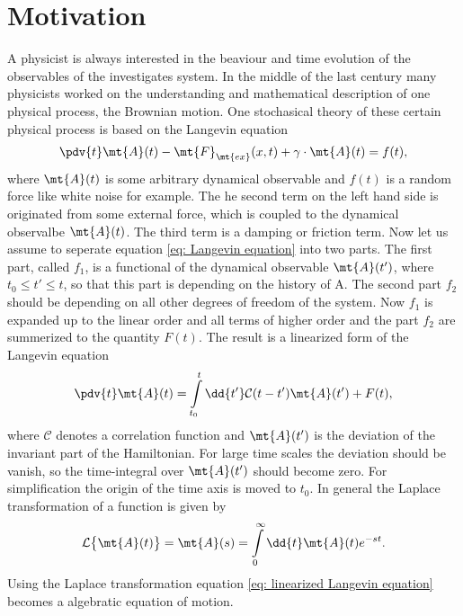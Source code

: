 \section{Motivation}
\label{sec: motivation}
%
%
A physicist is always interested in the beaviour and time evolution of the observables of the investigates system.
In the middle of the last century many physicists worked on the understanding and mathematical description of one physical process, the Brownian motion.
One stochasical theory of these certain physical process is based on the Langevin equation
%
\begin{align}
	\pdv{t} \mt{A}(t) -\mt{F}_{\mt{ex}}(x,t) + \gamma \cdot \mt{A}(t) = f(t),
	\label{eq: Langevin equation}
\end{align}
%
where $\mt{A}(t)$ is some arbitrary dynamical observable and $f(t)$ is a random force like white noise for example.
The he second term on the left hand side is originated from some external force, which is coupled to the dynamical observalbe $\mt{A}(t)$.
The third term is a damping or friction term.
Now let us assume to seperate equation \eqref{eq: Langevin equation} into two parts.
The first part, called $f_{1}$, is a functional of the dynamical observable $\mt{A}(t')$, where $t_{0} \leq t' \leq t$, so that this part is depending on the history of A.
The second part $f_{2}$ should be depending on all other degrees of freedom of the system.
Now $f_{1}$ is expanded up to the linear order and all terms of higher order and the part $f_{2}$ are summerized to the quantity $F(t)$.
The result is a linearized form of the Langevin equation
%
\begin{align}
	\pdv{t} \mt{A}(t) = \int\limits_{t_{0}}^{t} \dd{t'} \mathcal{C}(t-t') \mt{A}(t') + F(t),
	\label{eq: linearized Langevin equation}
\end{align}
%
where $\mathcal{C}$ denotes a correlation function and $\mt{A}(t')$ is the deviation of the invariant part of the Hamiltonian.
For large time scales the deviation should be vanish, so the time-integral over $\mt{A}(t')$ should become zero.
For simplification the origin of the time axis is moved to $t_{0}$.
In general the Laplace transformation of a function is given by
%
\begin{align}
	\mathcal{L}\big\{\mt{A}(t)\big\} = \mt{A}(s) = \int\limits_{0}^{\infty} \dd{t} \mt{A}(t) e^{-st}.
	\label{eq: Laplace transformation real axis}
\end{align}
%
Using the Laplace transformation equation \eqref{eq: linearized Langevin equation} becomes a algebratic equation of motion.
